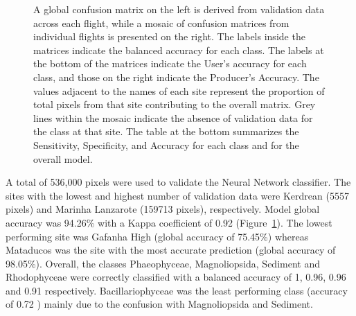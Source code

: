 \documentclass[
  number]{elsarticle}
\begin{document}
\label{cell-fig-Validation}
\begin{figure}[H]


\caption{\label{fig-Validation}A global confusion matrix on the left is
derived from validation data across each flight, while a mosaic of
confusion matrices from individual flights is presented on the right.
The labels inside the matrices indicate the balanced accuracy for each
class. The labels at the bottom of the matrices indicate the User's
accuracy for each class, and those on the right indicate the Producer's
Accuracy. The values adjacent to the names of each site represent the
proportion of total pixels from that site contributing to the overall
matrix. Grey lines within the mosaic indicate the absence of validation
data for the class at that site. The table at the bottom summarizes the
Sensitivity, Specificity, and Accuracy for each class and for the
overall model.}

\end{figure}%

A total of 536,000 pixels were used to validate the Neural Network
classifier. The sites with the lowest and highest number of validation
data were Kerdrean (5557 pixels) and Marinha Lanzarote (159713 pixels),
respectively. Model global accuracy was 94.26\% with a Kappa coefficient
of 0.92 (Figure~\ref{fig-Validation}). The lowest performing site was
Gafanha High (global accuracy of 75.45\%) whereas Mataducos was the site
with the most accurate prediction (global accuracy of 98.05\%). Overall,
the classes Phaeophyceae, Magnoliopsida, Sediment and Rhodophyceae were
correctly classified with a balanced accuracy of 1, 0.96, 0.96 and 0.91
respectively. Bacillariophyceae was the least performing class (accuracy
of 0.72 ) mainly due to the confusion with Magnoliopsida and Sediment.
\end{document}
